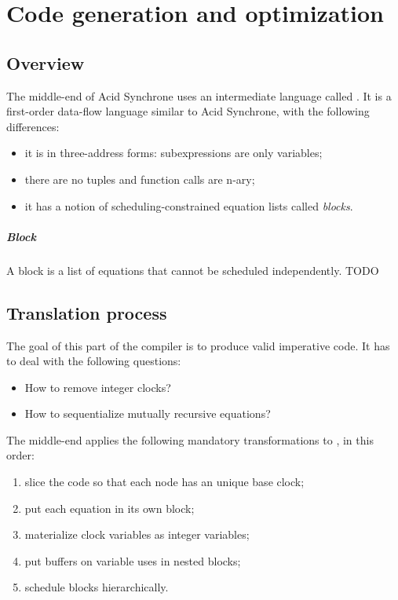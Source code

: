 \chapter{Code generation and optimization}

\section{Overview}

The middle-end of Acid Synchrone uses an intermediate language called \nir{}. It
is a first-order data-flow language similar to Acid Synchrone, with the
following differences:
\begin{itemize}
\item it is in three-address forms: subexpressions are only variables;
\item there are no tuples and function calls are n-ary;
\item it has a notion of scheduling-constrained equation lists called \textit{blocks}.
\end{itemize}

\paragraph{Block}

A block is a list of equations that cannot be scheduled independently. TODO

\section{Translation process}

The goal of this part of the compiler is to produce valid imperative code. It
has to deal with the following questions:
\begin{itemize}
\item How to remove integer clocks?
\item How to sequentialize mutually recursive equations?
\end{itemize}

The middle-end applies the following mandatory transformations to \nir{}, in this
order:
\begin{enumerate}
\item slice the code so that each node has an unique base clock;
\item put each equation in its own block;
\item materialize clock variables as integer variables;
\item put buffers on variable uses in nested blocks;
\item schedule blocks hierarchically.
\end{enumerate}

